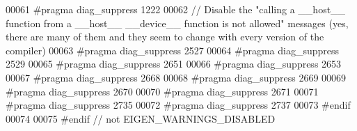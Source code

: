 \begin{DoxyCode}
00061 \textcolor{preprocessor}{  #pragma diag\_suppress 1222}
00062   \textcolor{comment}{// Disable the "calling a \_\_host\_\_ function from a \_\_host\_\_ \_\_device\_\_ function is not allowed" messages
       (yes, there are many of them and they seem to change with every version of the compiler)}
00063 \textcolor{preprocessor}{  #pragma diag\_suppress 2527}
00064 \textcolor{preprocessor}{  #pragma diag\_suppress 2529}
00065 \textcolor{preprocessor}{  #pragma diag\_suppress 2651}
00066 \textcolor{preprocessor}{  #pragma diag\_suppress 2653}
00067 \textcolor{preprocessor}{  #pragma diag\_suppress 2668}
00068 \textcolor{preprocessor}{  #pragma diag\_suppress 2669}
00069 \textcolor{preprocessor}{  #pragma diag\_suppress 2670}
00070 \textcolor{preprocessor}{  #pragma diag\_suppress 2671}
00071 \textcolor{preprocessor}{  #pragma diag\_suppress 2735}
00072 \textcolor{preprocessor}{  #pragma diag\_suppress 2737}
00073 \textcolor{preprocessor}{#endif}
00074 
00075 \textcolor{preprocessor}{#endif // not EIGEN\_WARNINGS\_DISABLED}
\end{DoxyCode}
